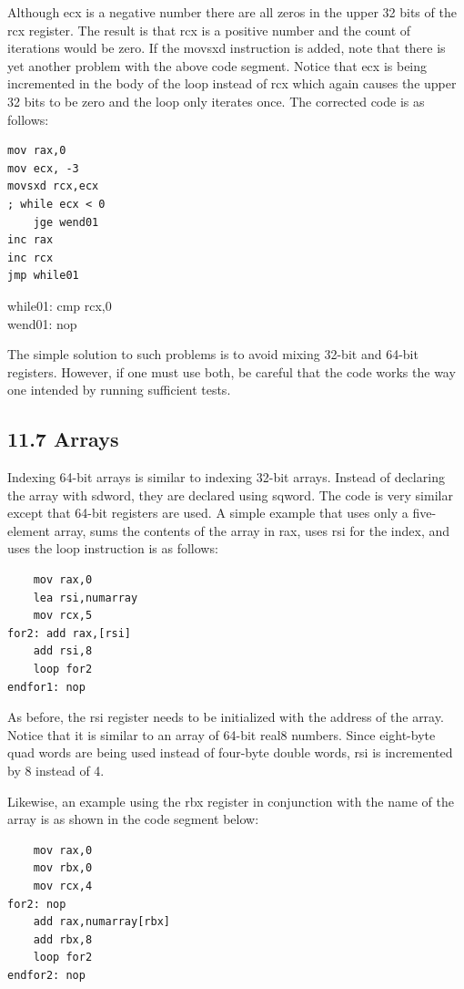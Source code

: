 \documentclass[10pt]{book}
\begin{document}
Although ecx is a negative number there are all zeros in the upper 32 bits of the rcx register. The result is that rcx is a positive number and the count of iterations would be zero. If the movsxd instruction is added, note that there is yet another problem with the above code segment. Notice that ecx is being incremented in the body of the loop instead of rcx which again causes the upper 32 bits to be zero and the loop only iterates once. The corrected code is as follows:

\begin{verbatim}
mov rax,0
mov ecx, -3
movsxd rcx,ecx
; while ecx < 0
    jge wend01
inc rax
inc rcx
jmp while01
\end{verbatim}

while01: cmp rcx,0\\
wend01: nop

The simple solution to such problems is to avoid mixing 32-bit and 64-bit registers. However, if one must use both, be careful that the code works the way one intended by running sufficient tests.

\subsection*{11.7 Arrays}
Indexing 64-bit arrays is similar to indexing 32-bit arrays. Instead of declaring the array with sdword, they are declared using sqword. The code is very similar except that 64-bit registers are used. A simple example that uses only a five-element array, sums the contents of the array in rax, uses rsi for the index, and uses the loop instruction is as follows:


\begin{verbatim}
    mov rax,0
    lea rsi,numarray
    mov rcx,5
for2: add rax,[rsi]
    add rsi,8
    loop for2
endfor1: nop
\end{verbatim}

As before, the rsi register needs to be initialized with the address of the array. Notice that it is similar to an array of 64-bit real8 numbers. Since eight-byte quad words are being used instead of four-byte double words, rsi is incremented by 8 instead of 4.

Likewise, an example using the rbx register in conjunction with the name of the array is as shown in the code segment below:

\begin{verbatim}
    mov rax,0
    mov rbx,0
    mov rcx,4
for2: nop
    add rax,numarray[rbx]
    add rbx,8
    loop for2
endfor2: nop
\end{verbatim}
\end{document}
